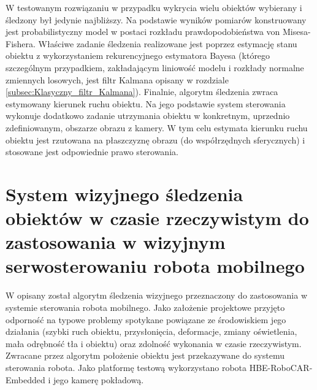 {W testowanym rozwiązaniu w przypadku wykrycia wielu obiektów wybierany i śledzony był jedynie najbliższy. Na podstawie wyników pomiarów konstruowany jest probabilistyczny model w postaci rozkładu prawdopodobieństwa von Misesa-Fishera. Właściwe zadanie śledzenia realizowane jest poprzez estymację stanu obiektu z wykorzystaniem rekurencyjnego estymatora Bayesa (którego szczególnym przypadkiem, zakładającym liniowość modelu i rozkłady normalne zmiennych losowych, jest filtr Kalmana opisany w rozdziale \ref{subsec:Klasyczny_filtr_Kalmana}). Finalnie, algorytm śledzenia zwraca estymowany kierunek ruchu obiektu. Na jego podstawie system sterowania wykonuje dodatkowo zadanie utrzymania obiektu w konkretnym, uprzednio zdefiniowanym, obszarze obrazu z kamery. W tym celu estymata kierunku ruchu obiektu jest rzutowana na płaszczyznę obrazu (do współrzędnych sferycznych) i stosowane jest odpowiednie prawo sterowania. 

\section{System wizyjnego śledzenia obiektów w czasie rzeczywistym do zastosowania w wizyjnym serwosterowaniu robota mobilnego}
\label{sec:Przyklad_Zhang2011}

W \cite{Zhang2011} opisany został algorytm śledzenia wizyjnego przeznaczony do zastosowania w systemie sterowania robota mobilnego. Jako założenie projektowe przyjęto odporność na typowe problemy spotykane powiązane ze środowiskiem jego działania (szybki ruch obiektu, przysłonięcia, deformacje, zmiany oświetlenia, mała odrębność tła i obiektu) oraz zdolność wykonania w czasie rzeczywistym. Zwracane przez algorytm położenie obiektu jest przekazywane do systemu sterowania robota. Jako platformę testową wykorzystano robota HBE-RoboCAR-Embedded i jego kamerę pokładową. 

}
